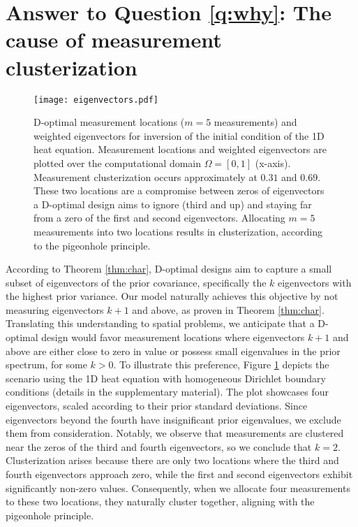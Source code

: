\section{Answer to Question \ref{q:why}: The cause of measurement clusterization}\label{section:why}
\begin{figure}
    \centering
    \texttt{[image: eigenvectors.pdf]}
    \caption{D-optimal measurement locations ($m=5$ measurements) and
      weighted eigenvectors for inversion of the initial condition of
      the 1D heat equation. Measurement locations and weighted
      eigenvectors are plotted over the computational domain $\Omega =
      [0, 1]$ (x-axis). Measurement clusterization occurs
      approximately at $0.31$ and $0.69$. These two locations are a
      compromise between zeros of eigenvectors a D-optimal design aims
      to ignore (third and up) and staying far from a zero of the
      first and second eigenvectors. Allocating $m=5$ measurements
      into two locations results in clusterization, according to the
      pigeonhole principle.}
  \label{fig:why}
\end{figure}


According to Theorem \ref{thm:char}, D-optimal designs aim to capture
a small subset of eigenvectors of the prior covariance, specifically
the $k$ eigenvectors with the highest prior variance. Our model
naturally achieves this objective by not measuring eigenvectors $k+1$
and above, as proven in Theorem \ref{thm:char}. Translating this
understanding to spatial problems, we anticipate that a D-optimal
design would favor measurement locations where eigenvectors $k+1$ and
above are either close to zero in value or possess small eigenvalues
in the prior spectrum, for some $k > 0$. To illustrate this
preference, Figure \ref{fig:why} depicts the scenario using the 1D
heat equation with homogeneous Dirichlet boundary conditions (details
in the supplementary material). The plot showcases four eigenvectors,
scaled according to their prior standard deviations. Since
eigenvectors beyond the fourth have insignificant prior eigenvalues,
we exclude them from consideration. Notably, we observe that
measurements are clustered near the zeros of the third and fourth
eigenvectors, so we conclude that $k=2$. Clusterization arises because
there are only two locations where the third and fourth eigenvectors
approach zero, while the first and second eigenvectors exhibit
significantly non-zero values. Consequently, when we allocate four
measurements to these two locations, they naturally cluster together,
aligning with the pigeonhole principle.

